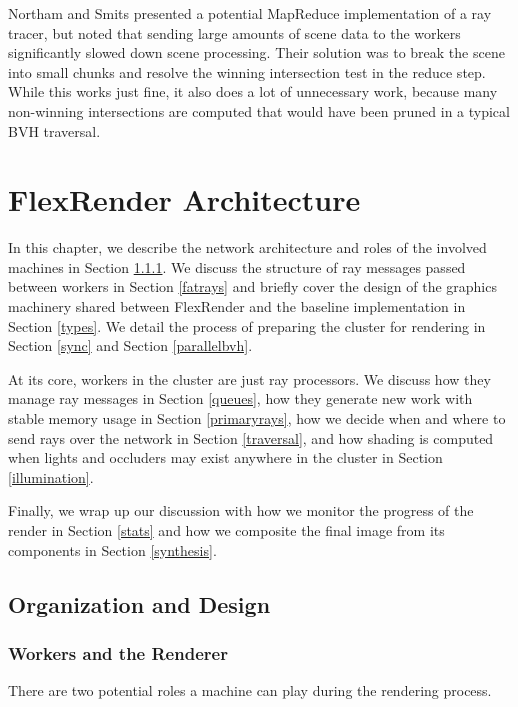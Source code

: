 \documentclass[12pt]{ucthesis}
\begin{document}
Northam and Smits \cite{northam:2011} presented a potential MapReduce
implementation of a ray tracer, but noted that sending large amounts of scene
data to the workers significantly slowed down scene processing. Their solution
was to break the scene into small chunks and resolve the winning intersection
test in the reduce step. While this works just fine, it also does a lot of
unnecessary work, because many non-winning intersections are computed that
would have been pruned in a typical BVH traversal.

\chapter{FlexRender Architecture}
\label{architecture}

In this chapter, we describe the network architecture and roles of the involved
machines in Section \ref{workers}. We discuss the structure of ray messages
passed between workers in Section \ref{fatrays} and briefly cover the design of
the graphics machinery shared between FlexRender and the baseline implementation
in Section \ref{types}. We detail the process of preparing the cluster for
rendering in Section \ref{sync} and Section \ref{parallelbvh}.

At its core, workers in the cluster are just ray processors. We discuss how they
manage ray messages in Section \ref{queues}, how they generate new work with
stable memory usage in Section \ref{primaryrays}, how we decide when and where
to send rays over the network in Section \ref{traversal}, and how shading is computed
when lights and occluders may exist anywhere in the cluster in Section \ref{illumination}.

Finally, we wrap up our discussion with how we monitor the progress of the
render in Section \ref{stats} and how we composite the final image from its
components in Section \ref{synthesis}.

\section{Organization and Design}
\label{organization}

\subsection{Workers and the Renderer}
\label{workers}

There are two potential roles a machine can play during the rendering process.
\end{document}
